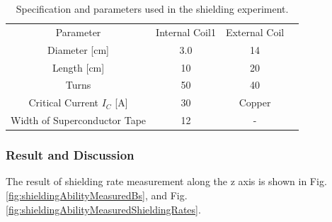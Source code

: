 \begin{table}[H]
  \centering
  \caption{Specification and parameters used in the shielding experiment.}
  \label{tab:shieldingRateExpParameters}
  \begin{tabular}{cccc}\hline\hline
    Parameter & Internal Coil1 & External Coil \\
    Diameter [cm] & 3.0 & 14\\
    Length [cm] & 10 & 20 \\
    Turns & 50 & 40 \\
    Critical Current $I_C$ [A] & 30 & Copper \\
    Width of Superconductor Tape & 12 & -\\\hline\hline
  \end{tabular}
\end{table}


\subsubsection{Result and Discussion}
The result of shielding rate measurement along the z axis is shown in Fig. \ref{fig:shieldingAbilityMeasuredBs}, and Fig. \ref{fig:shieldingAbilityMeasuredShieldingRates}.

